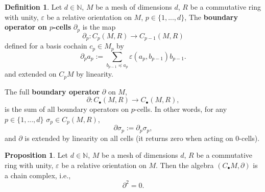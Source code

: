 \documentclass[fleqn]{article}
\theoremstyle{definition}
\newtheorem{proposition}[theorem]{Proposition}
\newtheorem{definition}[theorem]{Definition}
\begin{document}
\begin{definition}
  Let
    $d \in \mathbb{N}$,
    $M$ be a mesh of dimensions $d$,
    $R$ be a commutative ring with unity,
    $\varepsilon$ be a relative orientation on $M$,
    $p \in \{1, ..., d\}$,
  The \textbf{boundary operator on $p$-cells} $\partial_p$ is the map
  \begin{equation}
     \partial_p \colon C_p(M, R) \to C_{p - 1}(M, R)
  \end{equation}
  defined for a basis cochain $c_p \in M_p$ by
  \begin{equation}
    \partial_p a_p
    := \sum_{b_{p - 1} \preceq a_p} \varepsilon(a_p, b_{p - 1}) b_{p - 1}.
  \end{equation}
  and extended on $C_p M$ by linearity.

  The full \textbf{boundary operator} $\partial$ on $M$,
  \begin{equation}
    \partial \colon C_\bullet(M, R) \to C_\bullet(M, R),
  \end{equation}
  is the sum of all boundary operators on $p$-cells.
  In other words, for any $p \in \{1, ..., d\}$ $\sigma_p \in C_p(M, R)$,
  \begin{equation}
    \partial \sigma_p := \partial_p \sigma_p,
  \end{equation}
  and $\partial$ is extended by linearity on all cells
  (it returns zero when acting on $0$-cells).
\end{definition}

\begin{proposition}
  Let
    $d \in \mathbb{N}$,
    $M$ be a mesh of dimensions $d$,
    $R$ be a commutative ring with unity,
    $\varepsilon$ be a relative orientation on $M$.
  Then the algebra $(C_\bullet M, \partial)$ is a chain complex, i.e.,
  \begin{equation}
    \partial^2 = 0.
  \end{equation}
\end{proposition}
\end{document}
